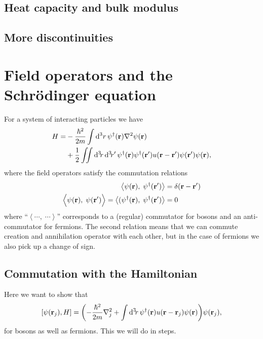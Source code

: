 \documentclass[11pt,letter, swedish, english
]{article}
\begin{document}
\subsection{Heat capacity and bulk modulus}



\subsection{More discontinuities}




\section{Field operators and the Schrödinger equation}
\newcommand{\scomm}[2]{\left\langle#1,\;#2\right\rangle}
\newcommand{\Scomm}[2]{\langle#1,\;#2\rangle}
\newcommand{\commute}[1]{\overbrace{#1}^{\text{commute}}}
For a system of interacting particles we have
\begin{equation}\label{eq:4_want_this}
\begin{aligned}
H=&-\frac{\hbar^2}{2m}\int\rd^3r\,
\psi^\dagger(\vb{r})\laplacian\psi(\vb{r})\\
&+\frac{1}{2}\iint\rd^3\!r\,\rd^3\!r'\,
\psi^\dagger(\vb{r})\psi^\dagger(\vb{r}')
u(\vb{r}-\vb{r}')\psi(\vb{r}')\psi(\vb{r}),
\end{aligned}
\end{equation}
where the field operators satisfy the commutation relations
\begin{equation}\label{eq:4_comm}
\begin{aligned}
\scomm{\psi(\vb{r})}{\psi^\dagger(\vb{r}')}
&=\delta(\vb{r}-\vb{r}')\\
\scomm{\psi(\vb{r})}{\psi(\vb{r}')\Big.}=
\scomm{(\psi^\dagger(\vb{r})}{\psi^\dagger(\vb{r}')}&=0
\end{aligned}
\end{equation}
where ``$\scomm{\cdots}{\cdots}$'' corresponds to a (regular)
commutator for bosons and an anti-commutator for fermions. The second
relation means that we can commute creation and annihilation operator
with each other, but in the case of fermions we also pick up a change
of sign. 


\subsection{Commutation with the Hamiltonian}
Here we want to show that 
\begin{equation}
\comm{\psi(\vb{r}_j)}{H}
=\qty(-\frac{\hbar^2}{2m}\laplacian_j
+\int\rd^3\!r\,
\psi^\dagger(\vb{r})
u(\vb{r}-\vb{r}_j)\psi(\vb{r})
)\psi(\vb{r}_j),
\end{equation}
for bosons as well as fermions.
This we will do in steps.
\end{document}
